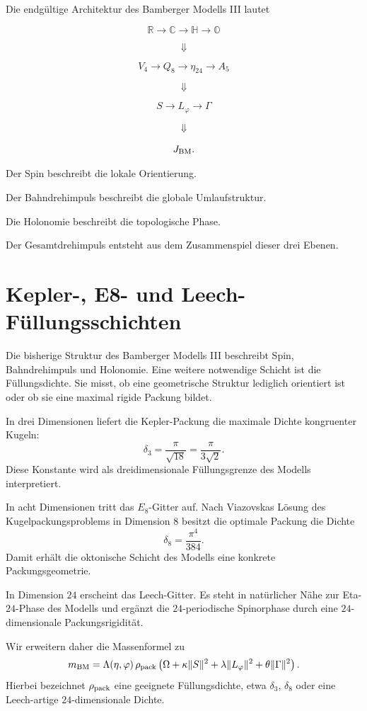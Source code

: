 \documentclass[11pt,a4paper]{article}
\theoremstyle{definition}
\theoremstyle{remark}
\begin{document}
	Die endgültige Architektur des Bamberger Modells III lautet
	
	\[
	\mathbb R
	\rightarrow
	\mathbb C
	\rightarrow
	\mathbb H
	\rightarrow
	\mathbb O
	\]
	
	\[
	\Downarrow
	\]
	
	\[
	V_4
	\rightarrow
	Q_8
	\rightarrow
	\eta_{24}
	\rightarrow
	A_5
	\]
	
	\[
	\Downarrow
	\]
	
	\[
	S
	\rightarrow
	L_\varphi
	\rightarrow
	\Gamma
	\]
	
	\[
	\Downarrow
	\]
	
	\[
	J_{\rm BM}.
	\]
	
	Der Spin beschreibt die lokale Orientierung.
	
	Der Bahndrehimpuls beschreibt die globale Umlaufstruktur.
	
	Die Holonomie beschreibt die topologische Phase.
	
	Der Gesamtdrehimpuls entsteht aus dem Zusammenspiel
	dieser drei Ebenen.
	
	\section{Kepler-, E8- und Leech-Füllungsschichten}
	
	Die bisherige Struktur des Bamberger Modells III beschreibt Spin,
	Bahndrehimpuls und Holonomie. Eine weitere notwendige Schicht ist die
	Füllungsdichte. Sie misst, ob eine geometrische Struktur lediglich
	orientiert ist oder ob sie eine maximal rigide Packung bildet.
	
	In drei Dimensionen liefert die Kepler-Packung die maximale Dichte
	kongruenter Kugeln:
	\[
	\delta_3=\frac{\pi}{\sqrt{18}}=\frac{\pi}{3\sqrt2}.
	\]
	Diese Konstante wird als dreidimensionale Füllungsgrenze des Modells
	interpretiert.
	
	In acht Dimensionen tritt das \(E_8\)-Gitter auf. Nach Viazovskas
	Lösung des Kugelpackungsproblems in Dimension \(8\) besitzt die optimale
	Packung die Dichte
	\[
	\delta_8=\frac{\pi^4}{384}.
	\]
	Damit erhält die oktonische Schicht des Modells eine konkrete
	Packungsgeometrie.
	
	In Dimension \(24\) erscheint das Leech-Gitter. Es steht in natürlicher
	Nähe zur Eta-\(24\)-Phase des Modells und ergänzt die
	\(24\)-periodische Spinorphase durch eine \(24\)-dimensionale
	Packungsrigidität.
	
	Wir erweitern daher die Massenformel zu
	\[
	m_{\rm BM}
	=
	\Lambda(\eta,\varphi)\,
	\rho_{\rm pack}
	\left(
	\Omega+\kappa\|S\|^2+\lambda\|L_\varphi\|^2
	+\theta\|\Gamma\|^2
	\right).
	\]
	Hierbei bezeichnet \(\rho_{\rm pack}\) eine geeignete
	Füllungsdichte, etwa \(\delta_3\), \(\delta_8\) oder eine
	Leech-artige \(24\)-dimensionale Dichte.
	
\end{document}

